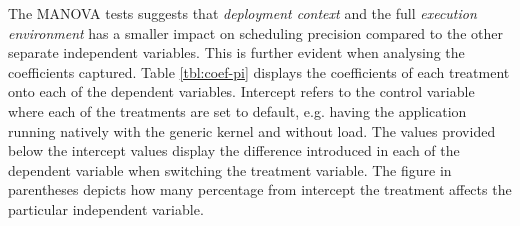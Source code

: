 The MANOVA tests suggests that \textit{deployment context} and the full \textit{execution environment} has a smaller impact on scheduling precision compared to the other separate independent variables. This is further evident when analysing the coefficients captured. Table \ref{tbl:coef-pi} displays the coefficients of each treatment onto each of the dependent variables. Intercept refers to the control variable where each of the treatments are set to default, e.g. having the application running natively with the generic kernel and without load. The values provided below the intercept values display the difference introduced in each of the dependent variable when switching the treatment variable. The figure in parentheses depicts how many percentage from intercept the treatment affects the particular independent variable.








